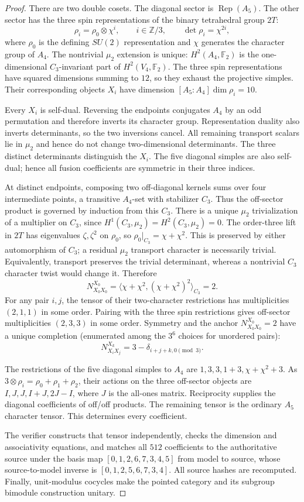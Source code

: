 \begin{proof}
There are two double cosets. The diagonal sector is
$\operatorname{Rep}(A_5)$. The other sector has the three spin
representations of the binary tetrahedral group $2T$:
\[
 \rho_i=\rho_0\otimes\chi^i,\qquad i\in\mathbb Z/3,
 \qquad\det\rho_i=\chi^{2i},
\]
where $\rho_0$ is the defining $SU(2)$ representation and $\chi$
generates the character group of $A_4$. The nontrivial $\mu_2$
extension is unique: $H^2(A_4,\mathbb F_2)$ is the one-dimensional
$C_3$-invariant part of $H^2(V_4,\mathbb F_2)$.
The three spin representations have squared dimensions summing to
$12$, so they exhaust the projective simples. Their corresponding
objects $X_i$ have dimension $[A_5:A_4]\dim\rho_i=10$.

Every $X_i$ is self-dual. Reversing the endpoints conjugates $A_4$
by an odd permutation and therefore inverts its character group.
Representation duality also inverts determinants, so the two
inversions cancel. All remaining transport scalars lie in $\mu_2$
and hence do not change two-dimensional determinants. The three
distinct determinants distinguish the $X_i$. The five diagonal
simples are also self-dual; hence all fusion coefficients are
symmetric in their three indices.

At distinct endpoints, composing two off-diagonal kernels sums over
four intermediate points, a transitive $A_4$-set with stabilizer
$C_3$. Thus the off-sector product is governed by induction from
this $C_3$. There is a unique $\mu_2$ trivialization of a multiplier
on $C_3$, since $H^1(C_3,\mu_2)=H^2(C_3,\mu_2)=0$.
The order-three lift in $2T$ has eigenvalues $\zeta,\zeta^2$ on
$\rho_0$, so $\rho_0|_{C_3}=\chi+\chi^2$. This is preserved by
either automorphism of $C_3$; a residual $\mu_2$ transport character
is necessarily trivial. Equivalently, transport preserves the
trivial determinant, whereas a nontrivial $C_3$ character twist
would change it. Therefore
\[
 N_{X_0X_0}^{X_0}
 =\langle\chi+\chi^2,(\chi+\chi^2)^2\rangle_{C_3}=2.
\]
For any pair $i,j$, the tensor of their two-character restrictions
has multiplicities $(2,1,1)$ in some order. Pairing with the three
spin restrictions gives off-sector multiplicities $(2,3,3)$ in some
order. Symmetry and the anchor $N_{X_0X_0}^{X_0}=2$ have a unique
completion (enumerated among the $3^6$ choices for unordered pairs):
\[
 N_{X_iX_j}^{X_k}=3-\delta_{i+j+k,0\pmod3}.
\]

The restrictions of the five diagonal simples to $A_4$ are
$1,3,3,1+3,\chi+\chi^2+3$. As
$3\otimes\rho_i=\rho_0+\rho_1+\rho_2$, their actions on the
three off-sector objects are $I,J,J,I+J,2J-I$, where $J$ is the
all-ones matrix. Reciprocity supplies the diagonal coefficients
of off/off products. The remaining tensor is the ordinary $A_5$
character tensor. This determines every coefficient.

The verifier constructs that tensor independently, checks the
dimension and associativity equations, and matches all $512$
coefficients to the authoritative source under the basis map
$[0,1,2,6,7,3,4,5]$ from model to source, whose source-to-model inverse
is $[0,1,2,5,6,7,3,4]$. All source hashes are recomputed. Finally,
unit-modulus cocycles make the pointed category and its subgroup
bimodule construction unitary.
\end{proof}

